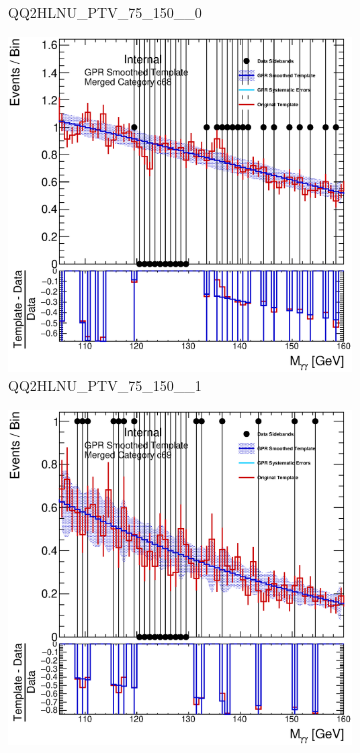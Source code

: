\begin{figure}
\begin{center}
\begin{subfigure}[T]{0.49\linewidth}
	\caption{QQ2HLNU\_PTV\_75\_150\_\_0}
\end{subfigure}
\begin{subfigure}[T]{0.49\linewidth}
	\centering
	\includegraphics[width=\linewidth]{figures/background/gpr/coupCatTemplates/GPR_Smoothed_Plot_hmgg_c68.eps}
	\caption{QQ2HLNU\_PTV\_75\_150\_\_1}
\end{subfigure}
\begin{subfigure}[T]{0.49\linewidth}
	\centering
	\includegraphics[width=\linewidth]{figures/background/gpr/coupCatTemplates/GPR_Smoothed_Plot_hmgg_c69.eps}

\end{subfigure}
\end{center}
\end{figure}
